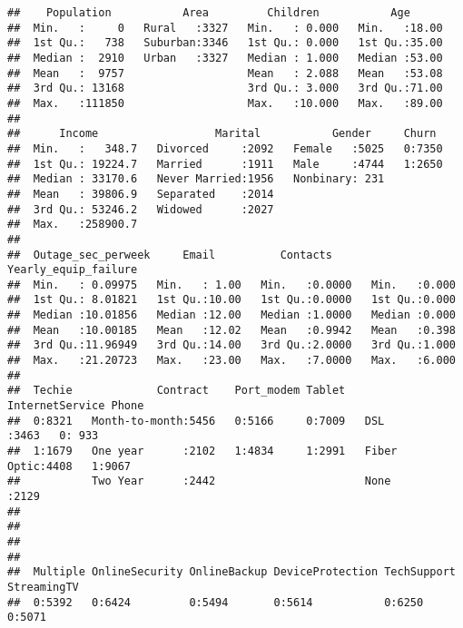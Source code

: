 \documentclass[
]{article}
\begin{document}
\begin{verbatim}
##    Population           Area         Children           Age       
##  Min.   :     0   Rural   :3327   Min.   : 0.000   Min.   :18.00  
##  1st Qu.:   738   Suburban:3346   1st Qu.: 0.000   1st Qu.:35.00  
##  Median :  2910   Urban   :3327   Median : 1.000   Median :53.00  
##  Mean   :  9757                   Mean   : 2.088   Mean   :53.08  
##  3rd Qu.: 13168                   3rd Qu.: 3.000   3rd Qu.:71.00  
##  Max.   :111850                   Max.   :10.000   Max.   :89.00  
##                                                                   
##      Income                  Marital           Gender     Churn   
##  Min.   :   348.7   Divorced     :2092   Female   :5025   0:7350  
##  1st Qu.: 19224.7   Married      :1911   Male     :4744   1:2650  
##  Median : 33170.6   Never Married:1956   Nonbinary: 231           
##  Mean   : 39806.9   Separated    :2014                            
##  3rd Qu.: 53246.2   Widowed      :2027                            
##  Max.   :258900.7                                                 
##                                                                   
##  Outage_sec_perweek     Email          Contacts      Yearly_equip_failure
##  Min.   : 0.09975   Min.   : 1.00   Min.   :0.0000   Min.   :0.000       
##  1st Qu.: 8.01821   1st Qu.:10.00   1st Qu.:0.0000   1st Qu.:0.000       
##  Median :10.01856   Median :12.00   Median :1.0000   Median :0.000       
##  Mean   :10.00185   Mean   :12.02   Mean   :0.9942   Mean   :0.398       
##  3rd Qu.:11.96949   3rd Qu.:14.00   3rd Qu.:2.0000   3rd Qu.:1.000       
##  Max.   :21.20723   Max.   :23.00   Max.   :7.0000   Max.   :6.000       
##                                                                          
##  Techie             Contract    Port_modem Tablet      InternetService Phone   
##  0:8321   Month-to-month:5456   0:5166     0:7009   DSL        :3463   0: 933  
##  1:1679   One year      :2102   1:4834     1:2991   Fiber Optic:4408   1:9067  
##           Two Year      :2442                       None       :2129           
##                                                                                
##                                                                                
##                                                                                
##                                                                                
##  Multiple OnlineSecurity OnlineBackup DeviceProtection TechSupport StreamingTV
##  0:5392   0:6424         0:5494       0:5614           0:6250      0:5071     

\end{verbatim}
\end{document}
